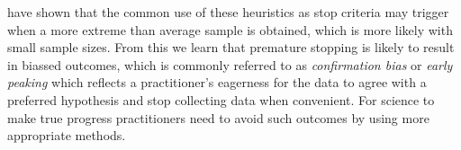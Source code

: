\cite{kruschke2015doing} have shown that the common use of these heuristics as stop criteria may
trigger when a more extreme than average sample is obtained, which is more likely with
small sample sizes. From this we learn that premature stopping is likely to result in
biassed outcomes, which is commonly referred to as {\it confirmation bias} or
{\it early peaking} which reflects a practitioner’s eagerness for the data to agree with a
preferred hypothesis and stop collecting data when convenient. For science to make true
progress practitioners need to avoid such outcomes by using more appropriate methods.
